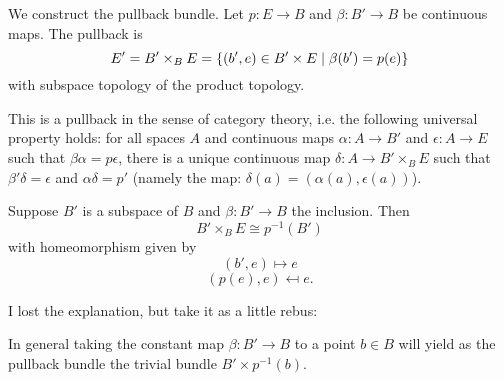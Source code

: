 
We construct the pullback bundle. Let $p:E\to B$ and $\beta:B'\to B$ be continuous maps. The pullback is \[E'=B'\times_B E=\{(b',e)\in B'\times E\mid \beta(b')=p(e)\}\]
with subspace topology of the product topology.

\begin{center}
\end{center}

This is a pullback in the sense of category theory, i.e. the following universal property holds: for all spaces $A$ and continuous maps $\alpha:A\to B'$ and $\epsilon:A\to E$ such that $\beta\alpha=p\epsilon$, there is a unique continuous map $\delta:A\to B'\times_B E$ such that $\beta'\delta=\epsilon$ and $\alpha\delta=p'$ (namely the map: $\delta(a)=(\alpha(a),\epsilon(a))$).
\begin{center}
\end{center}

\begin{example}
Suppose $B'$ is a subspace of $B$ and $\beta:B'\to B$ the inclusion. Then
\[B'\times_B E\cong p^{-1}(B')\]
with homeomorphism given by
\[(b',e)\mapsto e\]
\[(p(e),e)\mapsfrom e.\]
\end{example}

\begin{example}
I lost the explanation, but take it as a little rebus:
\begin{center}
\end{center}
\end{example}
In general taking the constant map $\beta:B'\to B$ to a point $b\in B$ will yield as the pullback bundle the trivial bundle $B'\times p^{-1}(b)$.


